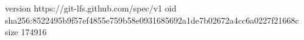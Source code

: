 version https://git-lfs.github.com/spec/v1
oid sha256:8522495b9f57ef4855e759b58e0931685692a1de7b02672a4cc6a0227f21668c
size 174916
